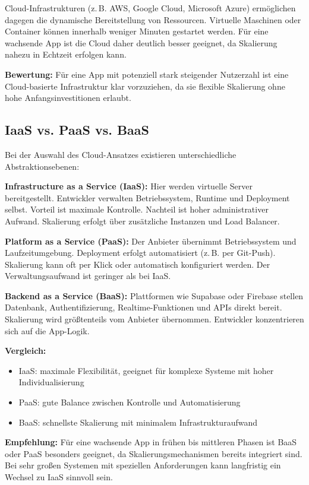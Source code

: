 Cloud-Infrastrukturen (z.\,B. AWS, Google Cloud, Microsoft Azure) ermöglichen dagegen die dynamische Bereitstellung von Ressourcen. Virtuelle Maschinen oder Container können innerhalb weniger Minuten gestartet werden. Für eine wachsende App ist die Cloud daher deutlich besser geeignet, da Skalierung nahezu in Echtzeit erfolgen kann.

\textbf{Bewertung:}  
Für eine App mit potenziell stark steigender Nutzerzahl ist eine Cloud-basierte Infrastruktur klar vorzuziehen, da sie flexible Skalierung ohne hohe Anfangsinvestitionen erlaubt.

\subsection{IaaS vs. PaaS vs. BaaS}

Bei der Auswahl des Cloud-Ansatzes existieren unterschiedliche Abstraktionsebenen:

\textbf{Infrastructure as a Service (IaaS):}  
Hier werden virtuelle Server bereitgestellt. Entwickler verwalten Betriebssystem, Runtime und Deployment selbst. Vorteil ist maximale Kontrolle. Nachteil ist hoher administrativer Aufwand. Skalierung erfolgt über zusätzliche Instanzen und Load Balancer.

\textbf{Platform as a Service (PaaS):}  
Der Anbieter übernimmt Betriebssystem und Laufzeitumgebung. Deployment erfolgt automatisiert (z.\,B. per Git-Push). Skalierung kann oft per Klick oder automatisch konfiguriert werden. Der Verwaltungsaufwand ist geringer als bei IaaS.

\textbf{Backend as a Service (BaaS):}  
Plattformen wie Supabase oder Firebase stellen Datenbank, Authentifizierung, Realtime-Funktionen und APIs direkt bereit. Skalierung wird größtenteils vom Anbieter übernommen. Entwickler konzentrieren sich auf die App-Logik.

\textbf{Vergleich:}

\begin{itemize}
\item IaaS: maximale Flexibilität, geeignet für komplexe Systeme mit hoher Individualisierung
\item PaaS: gute Balance zwischen Kontrolle und Automatisierung
\item BaaS: schnellste Skalierung mit minimalem Infrastrukturaufwand
\end{itemize}

\textbf{Empfehlung:}  
Für eine wachsende App in frühen bis mittleren Phasen ist BaaS oder PaaS besonders geeignet, da Skalierungsmechanismen bereits integriert sind. Bei sehr großen Systemen mit speziellen Anforderungen kann langfristig ein Wechsel zu IaaS sinnvoll sein.

